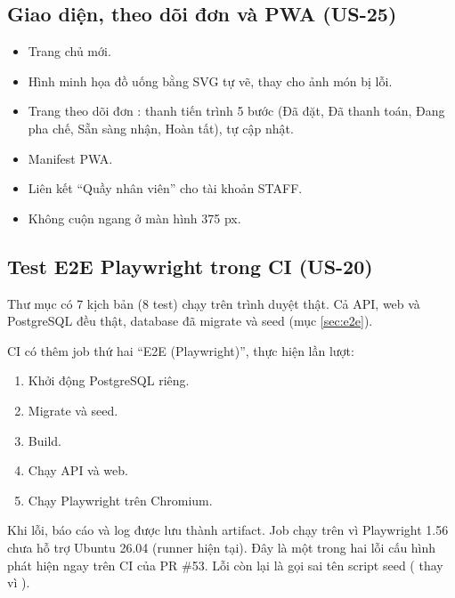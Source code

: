 
\subsection{Giao diện, theo dõi đơn và PWA (US-25)}
\begin{itemize}
\item Trang chủ mới.
\item Hình minh họa đồ uống bằng SVG tự vẽ, thay cho ảnh món bị lỗi.
\item Trang theo dõi đơn : thanh tiến trình 5 bước (Đã đặt, Đã thanh toán, Đang pha chế, Sẵn sàng nhận, Hoàn tất), tự cập nhật.
\item Manifest PWA.
\item Liên kết ``Quầy nhân viên'' cho tài khoản STAFF.
\item Không cuộn ngang ở màn hình 375 px.
\end{itemize}


\subsection{Test E2E Playwright trong CI (US-20)}
Thư mục  có 7 kịch bản (8 test) chạy trên trình duyệt thật. Cả API, web và PostgreSQL đều thật, database đã migrate và seed (mục \ref{sec:e2e}).

CI có thêm job thứ hai ``E2E (Playwright)'', thực hiện lần lượt:
\begin{enumerate}
\item Khởi động PostgreSQL riêng.
\item Migrate và seed.
\item Build.
\item Chạy API và web.
\item Chạy Playwright trên Chromium.
\end{enumerate}

Khi lỗi, báo cáo và log được lưu thành artifact. Job chạy trên  vì Playwright 1.56 chưa hỗ trợ Ubuntu 26.04 (runner  hiện tại). Đây là một trong hai lỗi cấu hình phát hiện ngay trên CI của PR \#53. Lỗi còn lại là gọi sai tên script seed ( thay vì ).

